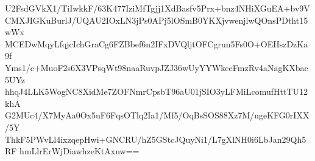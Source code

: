 U2FsdGVkX1/TiIwkkF/63K477IziMfTgjj1XdBasfv5Prx+bnz4NHiXGuEA+bv9V
CMXJIGKuBurlJ/UQAU2IOxLN3jPs0APj5lOSmB0YKXjvwenjlwQOnsPDtht15wWx
MCEDwMqyLfqjcIchGraCg6FZBbef6n2IFxDVQljtOFCgrun5Fs0O+OEHszDzKa9f
Yms1/c+MuoF2s6X3VPsqWt98naaRuvpJZJ36wUyYYWkceFmzRv4aNagKXbac5UYz
hhqJ4LLK5WogNC8XidMe7ZOFNmrCpsbT96aU01jSIO3yLFMiLcomufHttTU12khA
G2MUc4/X7MyAa0Ox5uF6FqsOTlq2Ia1/Mf5/OqBsSOS88Xz7M/ugeKFG0rIXX/5Y
ThkF5PWvLl4ixzqepHwi+GNCRU/hZ5GStcJQuyNi1/L7gXlNH0i6LbJan29Qh5RF
hmLlrErWjDiawhzeKtAxnw==
